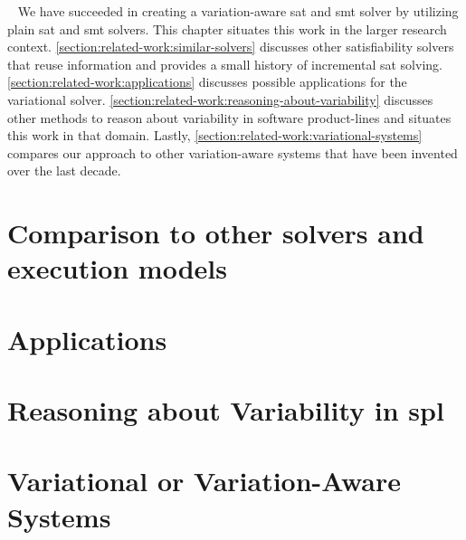~\label{chapter:related-work}
%
We have succeeded in creating a variation-aware \ac{sat} and \ac{smt} solver by
utilizing plain \ac{sat} and \ac{smt} solvers. This chapter situates this work
in the larger research context. \autoref{section:related-work:similar-solvers}
discusses other satisfiability solvers that reuse information and provides a
small history of incremental \ac{sat} solving.
\autoref{section:related-work:applications} discusses possible applications for
the variational solver.
\autoref{section:related-work:reasoning-about-variability} discusses other
methods to reason about variability in software product-lines and situates this
work in that domain. Lastly, \autoref{section:related-work:variational-systems}
compares our approach to other variation-aware systems that have been invented
over the last decade.
%
\section{Comparison to other solvers and execution models}

%
\section{Applications}

%
\section{Reasoning about Variability in \ac{spl}}

%
\section{Variational or Variation-Aware Systems}



